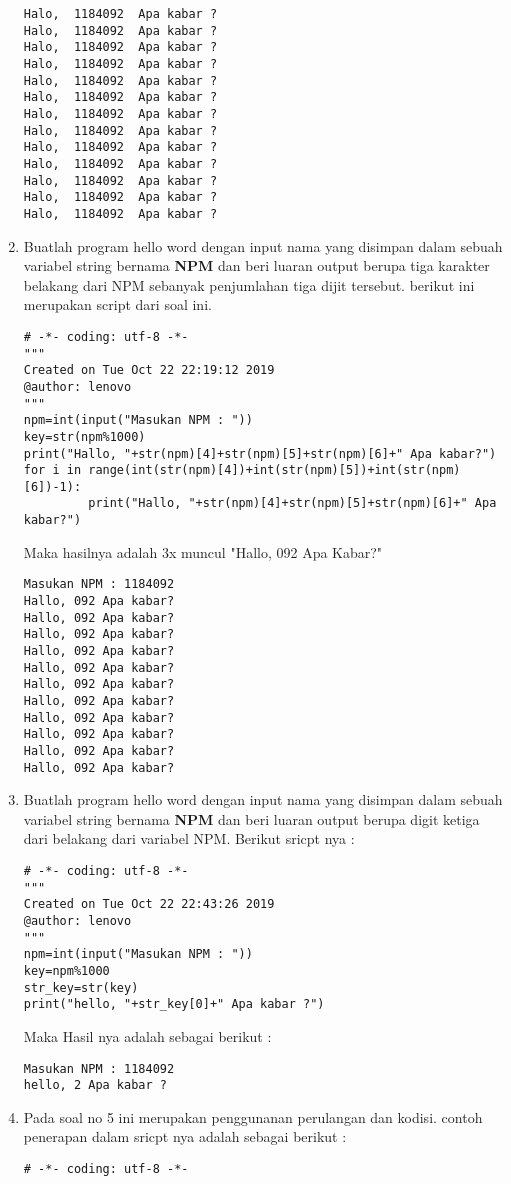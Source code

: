 \begin{enumerate}
\begin{verbatim}
Halo,  1184092  Apa kabar ?
Halo,  1184092  Apa kabar ?
Halo,  1184092  Apa kabar ?
Halo,  1184092  Apa kabar ?
Halo,  1184092  Apa kabar ?
Halo,  1184092  Apa kabar ?
Halo,  1184092  Apa kabar ?
Halo,  1184092  Apa kabar ?
Halo,  1184092  Apa kabar ?
Halo,  1184092  Apa kabar ?
Halo,  1184092  Apa kabar ?
Halo,  1184092  Apa kabar ?
Halo,  1184092  Apa kabar ?
\end{verbatim}
\item
Buatlah program hello word dengan input nama yang disimpan dalam sebuah variabel string bernama \textbf{NPM} dan beri luaran output berupa tiga karakter belakang dari NPM sebanyak penjumlahan tiga dijit tersebut. berikut ini merupakan script dari soal ini.
\begin{verbatim}
# -*- coding: utf-8 -*-
"""
Created on Tue Oct 22 22:19:12 2019
@author: lenovo
"""
npm=int(input("Masukan NPM : "))
key=str(npm%1000)
print("Hallo, "+str(npm)[4]+str(npm)[5]+str(npm)[6]+" Apa kabar?")
for i in range(int(str(npm)[4])+int(str(npm)[5])+int(str(npm)[6])-1):
         print("Hallo, "+str(npm)[4]+str(npm)[5]+str(npm)[6]+" Apa kabar?")
\end{verbatim}
Maka hasilnya adalah 3x muncul "Hallo, 092 Apa Kabar?" 
\begin{verbatim}
Masukan NPM : 1184092
Hallo, 092 Apa kabar?
Hallo, 092 Apa kabar?
Hallo, 092 Apa kabar?
Hallo, 092 Apa kabar?
Hallo, 092 Apa kabar?
Hallo, 092 Apa kabar?
Hallo, 092 Apa kabar?
Hallo, 092 Apa kabar?
Hallo, 092 Apa kabar?
Hallo, 092 Apa kabar?
Hallo, 092 Apa kabar?
\end{verbatim}
\item
Buatlah program hello word dengan input nama yang disimpan dalam sebuah variabel string bernama \textbf{NPM} dan beri luaran output berupa digit ketiga dari belakang dari variabel NPM. Berikut sricpt nya :
\begin{verbatim}
# -*- coding: utf-8 -*-
"""
Created on Tue Oct 22 22:43:26 2019
@author: lenovo
"""
npm=int(input("Masukan NPM : "))
key=npm%1000
str_key=str(key)
print("hello, "+str_key[0]+" Apa kabar ?")
\end{verbatim}
Maka Hasil nya adalah sebagai berikut :
\begin{verbatim}
Masukan NPM : 1184092
hello, 2 Apa kabar ?
\end{verbatim}
\item
Pada soal no 5 ini merupakan penggunanan perulangan dan kodisi. contoh penerapan dalam sricpt nya adalah sebagai berikut :
\begin{verbatim}
# -*- coding: utf-8 -*-

\end{verbatim}
\end{enumerate}
